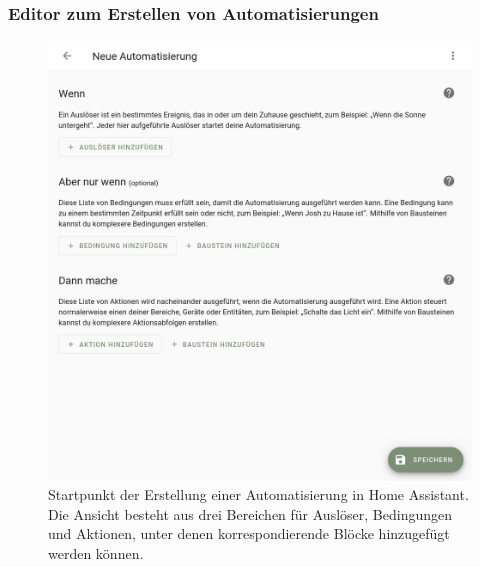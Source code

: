 \subsubsection{Editor zum Erstellen von Automatisierungen}
\begin{figure}[!ht]
  \begin{minipage}[t]{\hascwidth}
    \includegraphics[width=\linewidth]{assets/hassio-automation-empty.png}
    \caption[Erstellung einer Automatisierung in Home Assistant]{Startpunkt der Erstellung einer Automatisierung in Home Assistant. Die Ansicht besteht aus drei Bereichen für Auslöser, Bedingungen und Aktionen, unter denen korrespondierende Blöcke hinzugefügt werden können.}
    \label{figure:hassio-automation-empty}
  \end{minipage}
  \hfill
  \begin{minipage}[t]{\hascwidth}

\end{minipage}
\end{figure}

